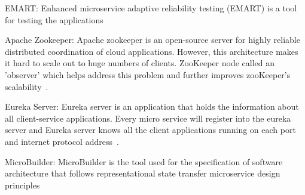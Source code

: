\par EMART: Enhanced microservice adaptive reliability testing (EMART) is a tool for testing the applications~\cite{Russo2020}

\par Apache Zookeeper: Apache zookeeper is an open-source server for highly reliable distributed coordination of cloud applications. However, this architecture makes it hard to scale out to huge numbers of clients. ZooKeeper node called an 'observer' which helps address this problem and further improves zooKeeper's scalability~\cite{Kalske2017, KalskeM2017}.


\par Eureka Server: Eureka server is an application that holds the information about all client-service applications. Every micro service will register into the eureka server and Eureka server knows all the client applications running on each port and internet protocol address~\cite{Uber}.


\par MicroBuilder: MicroBuilder is the tool used for the specification of software architecture that follows representational state transfer microservice design principles~\cite{Branko2018} 


